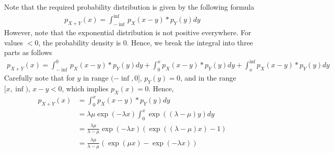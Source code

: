 \documentclass[../../probability-notes.tex]{subfiles}
\begin{document}
Note that the required probability distribution is given by the following formula
\begin{align*}
    p_{X+Y}(x) = \int_{-\inf}^{\inf} p_{X}(x-y) * p_{Y}(y) dy
\end{align*}
However, note that the exponential distribution is not positive everywhere. For values $ < 0$, the probability density is 0. Hence, we break the integral into three parts as follows
\begin{align*}
    p_{X+Y}(x) = \int_{-\inf}^{0} p_{X}(x-y) * p_{Y}(y) dy + \int_{0}^{x} p_{X}(x-y) * p_{Y}(y) dy + \int_{x}^{\inf} p_{X}(x-y) * p_{Y}(y) dy
\end{align*}
Carefully note that for $y$ in range $(-\inf,0]$, $p_{Y}(y) = 0$, and in the range $[x,\inf)$, $x-y < 0$, which implies $p_{X}(x) = 0$. Hence,
\begin{align*}
    p_{X+Y}(x) &= \int_{0}^{x} p_{X}(x-y) * p_{Y}(y) dy\\
    &= \lambda \mu \exp(-\lambda x) \int_{0}^{x} \exp((\lambda - \mu)y) dy\\
    &= \frac{\lambda \mu}{\lambda - \mu} \exp(-\lambda x) (\exp((\lambda - \mu)x) - 1)\\
    &= \frac{\lambda \mu}{\lambda - \mu}(\exp(\mu x) - \exp(-\lambda x))
\end{align*}
\end{document}
